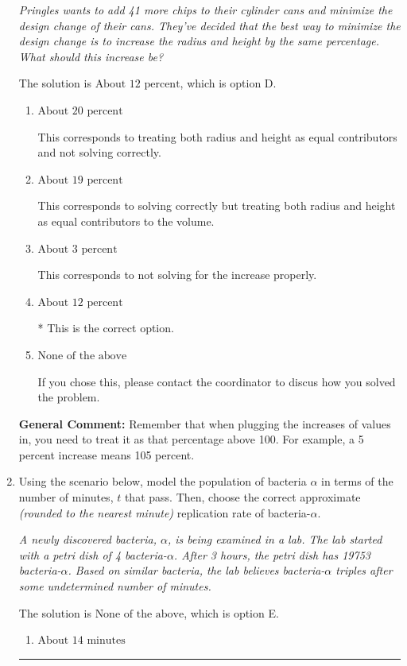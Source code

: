 \documentclass{extbook}[14pt]
\newcommand{\litem}[1]{\item #1

\rule{\textwidth}{0.4pt}}
\begin{document}
\begin{enumerate}
{\begin{center}
    \textit{ Pringles wants to add 41  more chips to their cylinder cans and minimize the design change of their cans. They've decided that the best way to minimize the design change is to increase the radius and height by the same percentage. What should this increase be? }
\end{center}
The solution is \( \text{About } 12 \text{ percent} \), which is option D.\begin{enumerate}[label=\Alph*.]
\item \( \text{About } 20 \text{ percent} \)

This corresponds to treating both radius and height as equal contributors and not solving correctly.
\item \( \text{About } 19 \text{ percent} \)

This corresponds to solving correctly but treating both radius and height as equal contributors to the volume.
\item \( \text{About } 3 \text{ percent} \)

This corresponds to not solving for the increase properly.
\item \( \text{About } 12 \text{ percent} \)

* This is the correct option.
\item \( \text{None of the above} \)

If you chose this, please contact the coordinator to discus how you solved the problem.
\end{enumerate}

\textbf{General Comment:} Remember that when plugging the increases of values in, you need to treat it as that percentage above 100. For example, a 5 percent increase means 105 percent.
}
\litem{
Using the scenario below, model the population of bacteria $\alpha$ in terms of the number of minutes, $t$ that pass. Then, choose the correct approximate \textit{(rounded to the nearest minute)} replication rate of bacteria-$\alpha$.

\begin{center}
    \textit{ A newly discovered bacteria, $\alpha$, is being examined in a lab. The lab started with a petri dish of 4 bacteria-$\alpha$. After 3 hours, the petri dish has 19753 bacteria-$\alpha$. Based on similar bacteria, the lab believes bacteria-$\alpha$ triples after some undetermined number of minutes. }
\end{center}
The solution is \( \text{None of the above} \), which is option E.\begin{enumerate}[label=\Alph*.]
\item \( \text{About } 14 \text{ minutes} \)


\end{enumerate}}
\end{enumerate}
\end{document}
